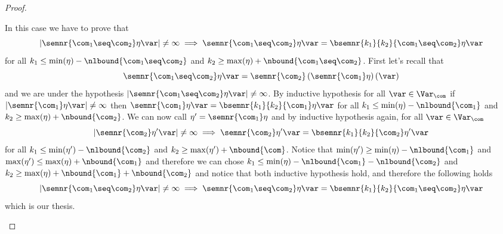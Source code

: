 \begin{proof}
\begin{inductive}
     In this case we have to prove that
    \begin{equation*}
      |\semnr{\com_1\seq\com_2}\eta\var| \neq \infty \implies \semnr{\com_1 \seq\com_2} \eta\var = \bsemnr{k_1}{k_2}{\com_1 \seq\com_2}\eta\var
    \end{equation*}
    for all \(k_1 \leq \min(\eta) -\nlbound{\com_1\seq\com_2}\) and
    \(k_2 \geq \max(\eta) + \nbound{\com_1\seq\com_2}\). First let's
    recall that
    \begin{equation*}
      \semnr{\com_1\seq\com_2}\eta\var = \semnr{\com_2}\left(\semnr{\com_1}\eta\right)(\var)
    \end{equation*}
    and we are under the hypothesis
    \(|\semnr{\com_1\seq\com_2}\eta\var| \neq \infty\). By inductive
    hypothesis for all \(\var \in \Var_{\com}\) if
    \(|\semnr{\com_1}\eta\var| \neq \infty\) then
    \(\semnr{\com_1}\eta\var = \bsemnr{k_1}{k_2}{\com_1}\eta\var\) for
    all \(k_1 \leq \min(\eta) - \nlbound{\com_1}\) and
    \(k_2 \geq \max(\eta) + \nbound{\com_2}\). We can now call
    \(\eta' = \semnr{\com_1}\eta\) and by inductive hypothesis again,
    for all \(\var\in\Var_{\com}\)
    \begin{equation*}
      |\semnr{\com_2}\eta'\var| \neq \infty \implies \semnr{\com_2}\eta'\var = \bsemnr{k_1}{k_2}{\com_2}\eta'\var
    \end{equation*}
    for all \(k_1 \leq \min(\eta') - \nlbound{\com_2}\) and
    \(k_2 \geq \max(\eta') + \nbound{\com}\). Notice that
    \(\min(\eta') \geq \min(\eta) - \nlbound{\com_1}\) and
    \(\max(\eta') \leq \max(\eta) + \nbound{\com_1}\) and therefore we
    can chose
    \(k_1 \leq \min(\eta) - \nlbound{\com_1} - \nlbound{\com_2}\) and
    \(k_2 \geq \max(\eta) + \nbound{\com_1} + \nbound{\com_2}\) and
    notice that both inductive hypothesis hold, and therefore the
    following holds
    \begin{equation*}
      |\semnr{\com_1\seq\com_2}\eta\var| \neq \infty \implies \semnr{\com_1\seq\com_2}\eta\var = \bsemnr{k_1}{k_2}{\com_1\seq\com_2}\eta\var
    \end{equation*}
    which is our thesis.
    

\end{inductive}
\end{proof}
